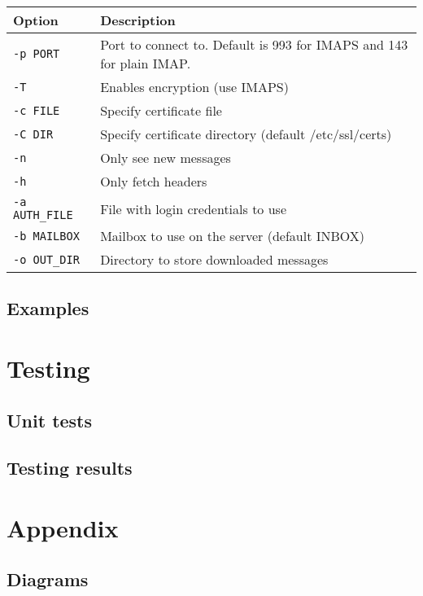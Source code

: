 \documentclass[a4]{report}
\begin{document}
\begin{table}[h]
  \renewcommand*{\arraystretch}{1.0}
  \centering
  \begin{tabular}{|l|l|}
    \hline
    Option & Description\\
    \hline
    \texttt{-p PORT}      & Port to connect to. Default is 993 for IMAPS and 143 for plain IMAP.\\
    \texttt{-T}          & Enables encryption (use IMAPS)\\
    \texttt{-c FILE}     & Specify certificate file\\
    \texttt{-C DIR}      & Specify certificate directory (default /etc/ssl/certs)\\
    \texttt{-n}          & Only see new messages\\
    \texttt{-h}          & Only fetch headers\\
    \texttt{-a AUTH\_FILE}& File with login credentials to use\\
    \texttt{-b MAILBOX}  & Mailbox to use on the server (default INBOX)\\
    \texttt{-o OUT\_DIR}  & Directory to store downloaded messages\\
    \hline
  \end{tabular}
\end{table}

\section{Examples}

\chapter{Testing}

\section{Unit tests}

\section{Testing results}

\chapter{Appendix}

\section{Diagrams}
\end{document}

